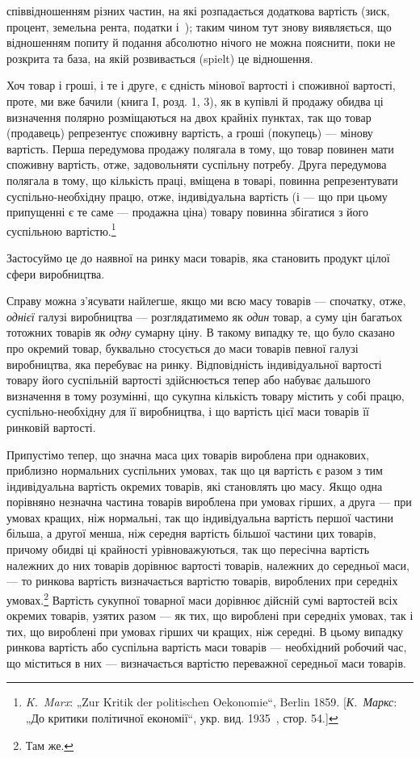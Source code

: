 \parcont{}  %
співвідношенням різних частин, на які розпадається додаткова
вартість (зиск, процент, земельна рента, податки і~); таким
чином тут знову виявляється, що відношенням попиту й подання
абсолютно нічого не можна пояснити, поки не розкрита та база,
на якій розвивається (spielt) це відношення.

Хоч товар і гроші, і те і друге, є єдність мінової вартості
і споживної вартості, проте, ми вже бачили (книга I, розд. 1, 3),
як в купівлі й продажу обидва ці визначення полярно розміщаються на двох крайніх пунктах, так що
товар (продавець)
репрезентує споживну вартість, а гроші (покупець) — мінову вартість. Перша передумова продажу
полягала в тому, що товар
повинен мати споживну вартість, отже, задовольняти суспільну
потребу. Друга передумова полягала в тому, що кількість
праці, вміщена в товарі, повинна репрезентувати суспільно-необхідну працю, отже, індивідуальна
вартість (і — що при цьому
припущенні є те саме — продажна ціна) товару повинна збігатися з його суспільною вартістю.\footnote{
\emph{K.~Marx}: „Zur Kritik der politischen Oekonomie“, Berlin 1859. [\emph{К.~Маркс}:
„До критики політичної економії“, укр. вид. 1935~, стор. 54.]
}

Застосуймо це до наявної на ринку маси товарів, яка становить продукт цілої сфери виробництва.

Справу можна з’ясувати найлегше, якщо ми всю масу товарів — спочатку, отже, \emph{однієї} галузі
виробництва — розглядатимемо
як \emph{один} товар, а суму цін багатьох тотожних товарів як \emph{одну}
сумарну ціну. В такому випадку те, що було сказано про окремий товар, буквально стосується до маси
товарів певної галузі
виробництва, яка перебуває на ринку. Відповідність індивідуальної вартості товару його суспільній
вартості здійснюється тепер
або набуває дальшого визначення в тому розумінні, що сукупна
кількість товару містить у собі працю, суспільно-необхідну для
її виробництва, і що вартість цієї маси товарів \deq{} її ринковій
вартості.

Припустімо тепер, що значна маса цих товарів вироблена
при однакових, приблизно нормальних суспільних умовах, так
що ця вартість є разом з тим індивідуальна вартість окремих
товарів, які становлять цю масу. Якщо одна порівняно незначна
частина товарів вироблена при умовах гірших, а друга — при умовах
кращих, ніж нормальні, так що індивідуальна вартість першої
частини більша, а другої менша, ніж середня вартість більшої частини цих товарів, причому обидві ці
крайності урівноважуються,
так що пересічна вартість належних до них товарів дорівнює
вартості товарів, належних до середньої маси, — то ринкова вартість визначається вартістю товарів,
вироблених при середніх
умовах.\footnote{
Там же.
} Вартість сукупної товарної маси дорівнює дійсній сумі
вартостей всіх окремих товарів, узятих разом — як тих, що вироблені при середніх умовах, так і тих,
що вироблені при умовах
гірших чи кращих, ніж середні. В цьому випадку ринкова
вартість або суспільна вартість маси товарів — необхідний робочий час, що міститься в них —
визначається вартістю переважної середньої маси товарів.

